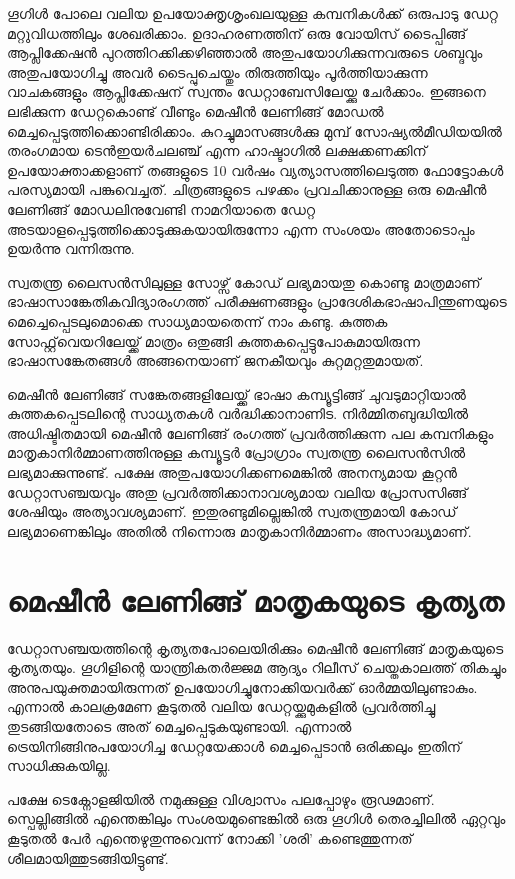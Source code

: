 \documentclass[12pt,twoside,a4paper]{article}
\begin{document}
ഗൂഗിൾ പോലെ വലിയ ഉപയോക്തൃശൃംഖലയുള്ള‌ കമ്പനികൾക്ക് ഒരുപാടു ഡേറ്റ മറ്റുവിധത്തിലും ശേഖരിക്കാം. ഉദാഹരണത്തിന് ഒരു വോയിസ് ടൈപ്പിങ്ങ് ആപ്ലിക്കേഷൻ പുറത്തിറക്കിക്കഴിഞ്ഞാൽ അതുപയോഗിക്കുന്നവരുടെ ശബ്ദവും അതുപയോഗിച്ചു അവർ ടൈപ്പുചെയ്തും തിരുത്തിയും പൂർത്തിയാക്കുന്ന വാചകങ്ങളും ആപ്ലിക്കേഷന് സ്വന്തം ഡേറ്റാബേസിലേയ്ക്കു ചേർക്കാം. ഇങ്ങനെ ലഭിക്കുന്ന ഡേറ്റകൊണ്ട് വീണ്ടും മെഷീൻ ലേണിങ്ങ് മോഡൽ മെച്ചപ്പെടുത്തിക്കൊണ്ടിരിക്കാം.
കുറച്ചുമാസങ്ങൾക്കു മുമ്പ് സോഷ്യൽമീഡിയയിൽ തരംഗമായ ടെൻഇയർചലഞ്ച് എന്ന ഹാഷ്ടാഗിൽ ലക്ഷക്കണക്കിന് ഉപയോക്താക്കളാണ് തങ്ങളുടെ 10 വർഷം വ്യത്യാസത്തിലെടുത്ത ഫോട്ടോകൾ പരസ്യമായി പങ്കുവെച്ചത്. ചിത്രങ്ങളുടെ പഴക്കം പ്രവചിക്കാനുള്ള ഒരു മെഷീൻ ലേണിങ്ങ് മോഡലിനുവേണ്ടി നാമറിയാതെ ഡേറ്റ അടയാളപ്പെടുത്തിക്കൊടുക്കുകയായിരുന്നോ എന്ന സംശയം അതോടൊപ്പം ഉയർന്നു വന്നിരുന്നു.


സ്വതന്ത്ര ലൈസൻസിലുള്ള സോഴ്സ് കോഡ് ലഭ്യമായതു കൊണ്ടു മാത്രമാണ് ഭാഷാസാങ്കേതികവിദ്യാരംഗത്ത് പരീക്ഷണങ്ങളും പ്രാദേശികഭാഷാപിന്തുണയുടെ മെച്ചെപ്പെടലുമൊക്കെ സാധ്യമായതെന്ന് നാം കണ്ടു. കുത്തക സോഫ്റ്റ്‌വെയറിലേയ്ക്ക് മാത്രം ഒതുങ്ങി കുത്തകപ്പെട്ടുപോകുമായിരുന്ന ഭാഷാസങ്കേതങ്ങൾ അങ്ങനെയാണ് ജനകീയവും കുറ്റമറ്റതുമായത്.

മെഷീൻ ലേണിങ്ങ് സങ്കേതങ്ങളിലേയ്ക്ക് ഭാഷാ കമ്പ്യൂട്ടിങ്ങ് ചുവടുമാറ്റിയാൽ കുത്തകപ്പെടലിന്റെ സാധ്യതകൾ വർദ്ധിക്കാനാണിട. നിർമ്മിതബുദ്ധിയിൽ അധിഷ്ടിതമായി മെഷീൻ ലേണിങ്ങ് രംഗത്ത് പ്രവർത്തിക്കുന്ന പല കമ്പനികളും മാതൃകാനിർമ്മാണത്തിനുള്ള കമ്പ്യൂട്ടർ പ്രോഗ്രാം സ്വതന്ത്ര ലൈസൻസിൽ ലഭ്യമാക്കുന്നുണ്ട്. പക്ഷേ അതുപയോഗിക്കണമെങ്കിൽ അനന്യമായ കൂറ്റൻ ഡേറ്റാസഞ്ചയവും അതു പ്രവർത്തിക്കാനാവശ്യമായ വലിയ പ്രോസസിങ്ങ് ശേഷിയും അത്യാവശ്യമാണ്. ഇതുരണ്ടുമില്ലെങ്കിൽ സ്വതന്ത്രമായി കോഡ് ലഭ്യമാണെങ്കിലും അതിൽ നിന്നൊരു മാതൃകാനിർമ്മാണം അസാദ്ധ്യമാണ്.


\section{മെഷീൻ ലേണിങ്ങ് മാതൃകയുടെ കൃത്യത}

ഡേറ്റാസഞ്ചയത്തിന്റെ കൃത്യതപോലെയിരിക്കും  മെഷീൻ ലേണിങ്ങ് മാതൃകയുടെ കൃത്യതയും. ഗൂഗിളിന്റെ യാന്ത്രികതർജ്ജമ ആദ്യം റിലീസ് ചെയ്തകാലത്ത് തികച്ചും അനുപയുക്തമായിരുന്നത് ഉപയോഗിച്ചുനോക്കിയവർക്ക് ഓർമ്മയിലുണ്ടാകും. എന്നാൽ കാലക്രമേണ കൂടുതൽ വലിയ ഡേറ്റയ്ക്കുമുകളിൽ പ്രവർത്തിച്ചു തുടങ്ങിയതോടെ അത് മെച്ചപ്പെടുകയുണ്ടായി. എന്നാൽ ട്രെയിനിങ്ങിനുപയോഗിച്ച ഡേറ്റയേക്കാൾ മെച്ചപ്പെടാൻ ഒരിക്കലും ഇതിന് സാധിക്കുകയില്ല.

പക്ഷേ ടെക്നോളജിയിൽ നമുക്കുള്ള വിശ്വാസം പലപ്പോഴും രൂഢമാണ്. സ്പെല്ലിങ്ങിൽ എന്തെങ്കിലും സംശയമുണ്ടെങ്കിൽ ഒരു ഗൂഗിൾ തെരച്ചിലിൽ ഏറ്റവും കൂടുതൽ പേർ എന്തെഴുതുന്നുവെന്ന് നോക്കി 'ശരി' കണ്ടെത്തുന്നത് ശീലമായിത്തുടങ്ങിയിട്ടുണ്ട്.
\end{document}

